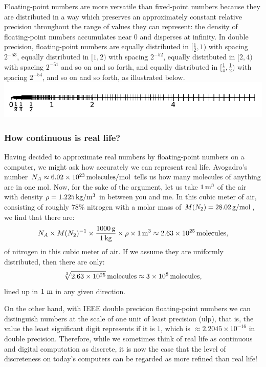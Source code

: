 Floating-point numbers are more versatile than fixed-point numbers because they are distributed in a way which preserves an approximately constant relative precision throughout the range of values they can represent: the density of floating-point numbers accumulates near $0$ and disperses at infinity. In double precision, floating-point numbers are equally distributed in $[\tfrac{1}{2},1)$ with spacing $2^{-53}$, equally distributed in $[1,2)$ with spacing $2^{-52}$, equally distributed in $[2,4)$ with spacing $2^{-51}$ and so on and so forth, and equally distributed in $[\tfrac{1}{4},\tfrac{1}{2})$ with spacing $2^{-54}$, and so on and so forth, as illustrated below.
\includegraphics[width=\textwidth]{FloatingPoint}

\subsubsection{How continuous is real life?}

Having decided to approximate real numbers by floating-point numbers on a computer, we might ask how accurately we can represent real life. Avogadro's number $N_A \approx 6.02\times10^{23}{\rm\,molecules}/{\rm mol}$ tells us how many molecules of anything are in one mol. Now, for the sake of the argument, let us take $1{\rm\,m}^3$ of the air with density $\rho = 1.225{\rm\,kg}/{\rm m}^3$ in between you and me. In this cubic meter of air, consisting of roughly $78\%$ nitrogen with a molar mass of $M(N_2) = 28.02{\rm\,g}/{\rm mol}$, we find that there are:
\[
N_A \times M(N_2)^{-1} \times \dfrac{1000{\rm\,g}}{1{\rm\,kg}} \times \rho \times 1{\rm\,m}^3 \approx 2.63\times10^{25}{\rm\,molecules},
\]
of nitrogen in this cubic meter of air. If we assume they are uniformly distributed, then there are only:
\[
\sqrt[3]{2.63\times10^{25}}{\rm\,molecules} \approx 3\times10^8{\rm\,molecules},
\]
lined up in $1{\rm~m}$ in any given direction.

On the other hand, with IEEE double precision floating-point numbers we can distinguish numbers at the scale of one unit of least precision (ulp), that is, the value the least significant digit represents if it is $1$, which is $\approx2.2045\times10^{-16}$ in double precision. Therefore, while we sometimes think of real life as continuous and digital computation as discrete, it is now the case that the level of discreteness on today's computers can be regarded as more refined than real life!


